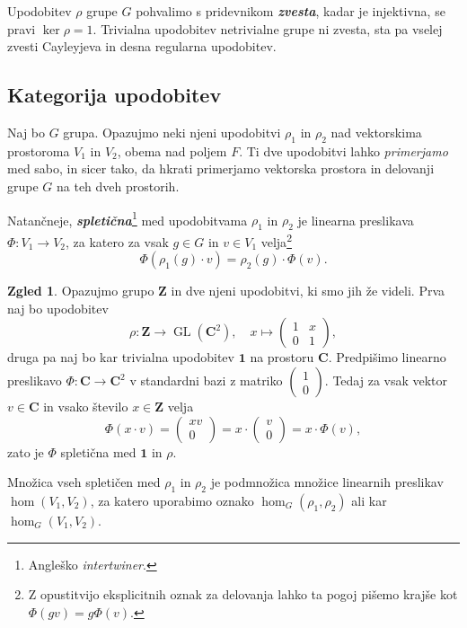 \documentclass[11pt]{book}
\def\ZZ{\mathbf{Z}}
\def\CC{\mathbf{C}}
\def\11{\mathbf{1}}
\DeclareMathOperator\GL{GL}
\def\definicija{\color{rdeca}\bf\em}
\theoremstyle{definition}
\theoremstyle{zgled}
\newtheorem*{zgled}{Zgled}
\theoremstyle{odprtproblem}
\theoremstyle{domacanaloga}
\theoremstyle{izrek}
\begin{document}
Upodobitev $\rho$ grupe $G$ pohvalimo s pridevnikom {\definicija zvesta}, kadar je injektivna, se pravi $\ker \rho = 1$. Trivialna upodobitev netrivialne grupe ni zvesta, sta pa vselej zvesti Cayleyjeva in desna regularna upodobitev.

\subsection{Kategorija upodobitev}

Naj bo $G$ grupa. Opazujmo neki njeni upodobitvi $\rho_1$ in $\rho_2$ nad vektorskima prostoroma $V_1$ in $V_2$, obema nad poljem $F$. Ti dve upodobitvi lahko \emph{primerjamo} med sabo, in sicer tako, da hkrati primerjamo vektorska prostora in delovanji grupe $G$ na teh dveh prostorih. 

Natančneje, {\definicija spletična}\footnote{Angleško \emph{intertwiner}.} med upodobitvama $\rho_1$ in $\rho_2$ je linearna preslikava $\Phi \colon V_1 \to V_2$, za katero za vsak $g \in G$ in $v \in V_1$ velja\footnote{Z opustitvijo eksplicitnih oznak za delovanja lahko ta pogoj pišemo krajše kot $\Phi(gv) = g\Phi(v)$.}
\[
  \Phi(\rho_1(g) \cdot v) = \rho_2(g) \cdot \Phi(v).
\]

\begin{zgled}
Opazujmo grupo $\ZZ$ in dve njeni upodobitvi, ki smo jih že videli. Prva naj bo upodobitev
\[
    \rho \colon \ZZ \to \GL(\CC^2), \quad
    x \mapsto \begin{pmatrix} 1 & x \\ 0 & 1 \end{pmatrix},
\]
druga pa naj bo kar trivialna upodobitev $\11$ na prostoru $\CC$. Predpišimo linearno preslikavo $\Phi \colon \CC \to \CC^2$ v standardni bazi z matriko $\left( \begin{smallmatrix} 1 \\ 0 \end{smallmatrix} \right)$. Tedaj za vsak vektor $v \in \CC$ in vsako število $x \in \ZZ$ velja
\[
    \Phi(x \cdot v) 
    =  \begin{pmatrix} xv \\ 0 \end{pmatrix} 
    = x \cdot  \begin{pmatrix} v \\ 0 \end{pmatrix} 
    = x \cdot \Phi(v),
\]
zato je $\Phi$ spletična med $\11$ in $\rho$.
\end{zgled}

Množica vseh spletičen med $\rho_1$ in $\rho_2$ je podmnožica množice linearnih preslikav $\hom(V_1, V_2)$, za katero uporabimo oznako $\hom_G(\rho_1, \rho_2)$ ali kar $\hom_G(V_1, V_2)$.
\end{document}
